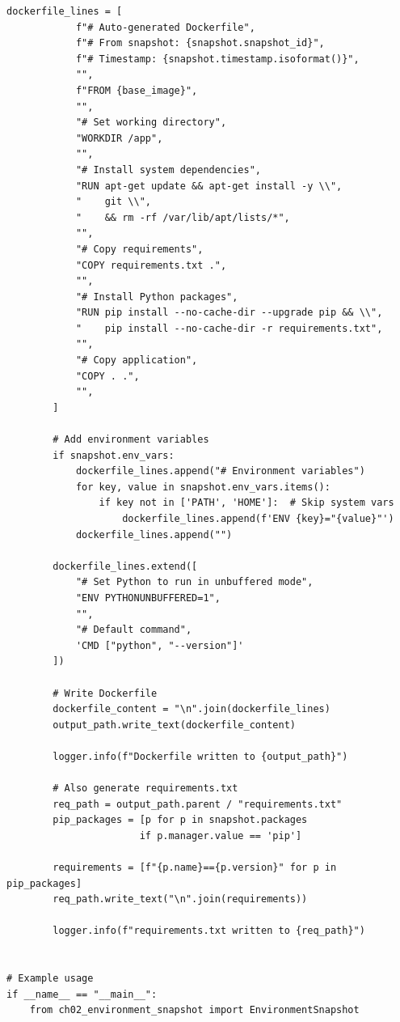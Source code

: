 \begin{lstlisting}[style=python, caption={Environment bootstrap script generator}]
        dockerfile_lines = [
            f"# Auto-generated Dockerfile",
            f"# From snapshot: {snapshot.snapshot_id}",
            f"# Timestamp: {snapshot.timestamp.isoformat()}",
            "",
            f"FROM {base_image}",
            "",
            "# Set working directory",
            "WORKDIR /app",
            "",
            "# Install system dependencies",
            "RUN apt-get update && apt-get install -y \\",
            "    git \\",
            "    && rm -rf /var/lib/apt/lists/*",
            "",
            "# Copy requirements",
            "COPY requirements.txt .",
            "",
            "# Install Python packages",
            "RUN pip install --no-cache-dir --upgrade pip && \\",
            "    pip install --no-cache-dir -r requirements.txt",
            "",
            "# Copy application",
            "COPY . .",
            "",
        ]

        # Add environment variables
        if snapshot.env_vars:
            dockerfile_lines.append("# Environment variables")
            for key, value in snapshot.env_vars.items():
                if key not in ['PATH', 'HOME']:  # Skip system vars
                    dockerfile_lines.append(f'ENV {key}="{value}"')
            dockerfile_lines.append("")

        dockerfile_lines.extend([
            "# Set Python to run in unbuffered mode",
            "ENV PYTHONUNBUFFERED=1",
            "",
            "# Default command",
            'CMD ["python", "--version"]'
        ])

        # Write Dockerfile
        dockerfile_content = "\n".join(dockerfile_lines)
        output_path.write_text(dockerfile_content)

        logger.info(f"Dockerfile written to {output_path}")

        # Also generate requirements.txt
        req_path = output_path.parent / "requirements.txt"
        pip_packages = [p for p in snapshot.packages
                       if p.manager.value == 'pip']

        requirements = [f"{p.name}=={p.version}" for p in pip_packages]
        req_path.write_text("\n".join(requirements))

        logger.info(f"requirements.txt written to {req_path}")


# Example usage
if __name__ == "__main__":
    from ch02_environment_snapshot import EnvironmentSnapshot


\end{lstlisting}
